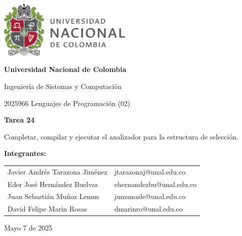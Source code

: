 \documentclass{article}
\begin{document}
\begin{titlepage}
    \centering
    \includegraphics[width=0.48\textwidth]{logo_universidad.png}
    \par\vspace{2cm}

    {\Large \textbf{Universidad Nacional de Colombia} \par}
    \vspace{0.5cm}
    {\large Ingeniería de Sistemas y Computación \par}
    {\large 2025966 Lenguajes de Programación (02)\par}
    \vspace{3cm}

    {\large \textbf{Tarea 24} \par}
    {\large Completar, compilar y ejecutar el analizador para la estructura de selección.\par}
    \vspace{3cm}

    {\large \textbf{Integrantes:} \par}
    \vspace{0.5cm}
    \begin{tabular}{ll}
    Javier Andrés Tarazona Jiménez & jtarazonaj@unal.edu.co \\
    Eder  José Hernández Buelvas   & ehernandezbu@unal.edu.co \\
    Juan Sebastián Muñoz Lemus     & jumunozle@unal.edu.co   \\
    David Felipe Marin Rosas       & dmarinro@unal.edu.co   \\
    \end{tabular}
    \par\vspace{3cm}

    {\large Mayo 7 de 2025 \par}
\end{titlepage}

\tableofcontents %

\newpage %
\end{document}
